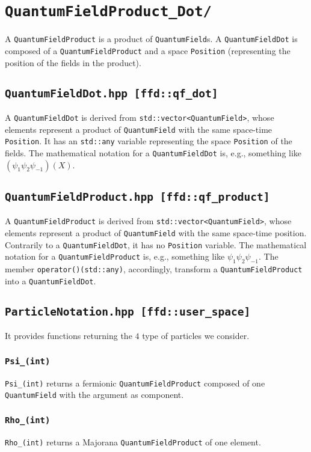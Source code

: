\chapter{\texttt{QuantumFieldProduct\_Dot/}}
A \texttt{QuantumFieldProduct} is a product of \texttt{QuantumField}s. A \texttt{QuantumFieldDot} is composed of a \texttt{QuantumFieldProduct} and a space \texttt{Position} (representing the position of the fields in the product).
\section{\texttt{QuantumFieldDot.hpp [ffd::qf\_dot]}}
A \texttt{QuantumFieldDot} is derived from \texttt{std::vector<QuantumField>}, whose elements represent a product of \texttt{QuantumField} with the same space-time \texttt{Position}. It has an \texttt{std::any} variable representing the space \texttt{Position} of the fields. The mathematical notation for a \texttt{QuantumFieldDot} is, e.g., something like $(\psi_1 \psi_2 \psi_{-1})(X)$.
\section{\texttt{QuantumFieldProduct.hpp [ffd::qf\_product]}}
A \texttt{QuantumFieldProduct} is derived from \texttt{std::vector<QuantumField>}, whose elements represent a product of \texttt{QuantumField} with the same space-time position. Contrarily to a \texttt{QuantumFieldDot}, it has no \texttt{Position} variable. The mathematical notation for a \texttt{QuantumFieldProduct} is, e.g., something like $\psi_1\psi_2\psi_{-1}$. The member \texttt{operator()(std::any)}, accordingly, transform a \texttt{QuantumFieldProduct} into a \texttt{QuantumFieldDot}.
\section{\texttt{ParticleNotation.hpp [ffd::user\_space]}}
It provides functions returning the $4$ type of particles we consider.
\subsection{\texttt{Psi\_(int)}}
\texttt{Psi\_(int)} returns a fermionic \texttt{QuantumFieldProduct} composed of one \texttt{QuantumField} with the argument as component.
\subsection{\texttt{Rho\_(int)}}
\texttt{Rho\_(int)} returns a Majorana \texttt{QuantumFieldProduct} of one element.
